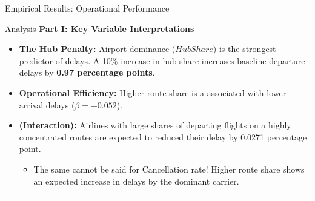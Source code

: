 \documentclass[t]{beamer}
\begin{document}
\begin{frame}{Empirical Results: Operational Performance}
\begin{table}
{
        }
    \end{table}
\end{frame}

\begin{frame}{Analysis}
    \small
    \textbf{Part I: Key Variable Interpretations}
    \begin{itemize}
        \item \textbf{The Hub Penalty:} Airport dominance ($HubShare$) is the strongest predictor of delays. A 10\% increase in hub share increases baseline departure delays by \textbf{0.97 percentage points}.
        \item \textbf{Operational Efficiency:} Higher route share is a associated with lower arrival delays ($\beta = -0.052$).
        \item \textbf{(Interaction):} Airlines with large shares of departing flights on a highly concentrated routes are expected to reduced their delay by  0.0271 percentage point. 
        \begin{itemize}
            \item The same cannot be said for Cancellation rate! Higher route share shows an expected increase in delays by the dominant carrier.
        \end{itemize}
        
        
    \end{itemize}

    \hrule
    \vspace{0.2cm}

\end{frame}
\end{document}
